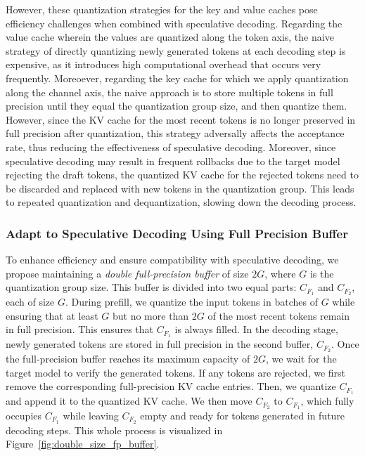 However, these quantization strategies for the key and value caches pose efficiency challenges when combined with speculative decoding. Regarding the value cache wherein the values are quantized along the token axis, the naive strategy of directly quantizing newly generated tokens at each decoding step is expensive, as it introduces high computational overhead that occurs very frequently. Moreoever, regarding the key cache for which we apply quantization along the channel axis, the naive approach is to store multiple tokens in full precision until they equal the quantization group size, and then quantize them. However, since the KV cache for the most recent tokens is no longer preserved in full precision after quantization, this strategy adversally affects the acceptance rate, thus reducing the effectiveness of speculative decoding. Moreover, since speculative decoding may result in frequent rollbacks due to the target model rejecting the draft tokens, the quantized KV cache for the rejected tokens need to be discarded and replaced with new tokens in the quantization group. This leads to repeated quantization and dequantization, slowing down the decoding process.


\subsubsection{Adapt to Speculative Decoding Using Full Precision Buffer} \label{sec:buffer}
To enhance efficiency and ensure compatibility with speculative decoding, we propose maintaining a \textit{double full-precision buffer} of size \(2G\), where \(G\) is the quantization group size. This buffer is divided into two equal parts: \(C_{F_1}\) and \(C_{F_2}\), each of size \(G\). During prefill, we quantize the input tokens in batches of \(G\) while ensuring that at least \(G\) but no more than \(2G\) of the most recent tokens remain in full precision. This ensures that \(C_{F_1}\) is always filled. In the decoding stage, newly generated tokens are stored in full precision in the second buffer, \(C_{F_2}\). Once the full-precision buffer reaches its maximum capacity of \(2G\), we wait for the target model to verify the generated tokens. If any tokens are rejected, we first remove the corresponding full-precision KV cache entries. Then, we quantize \(C_{F_1}\) and append it to the quantized KV cache. We then move \(C_{F_2}\) to \(C_{F_1}\), which fully occupies \(C_{F_1}\) while leaving \(C_{F_2}\) empty and ready for tokens generated in future decoding steps. This whole process is visualized in Figure~\ref{fig:double_size_fp_buffer}.


